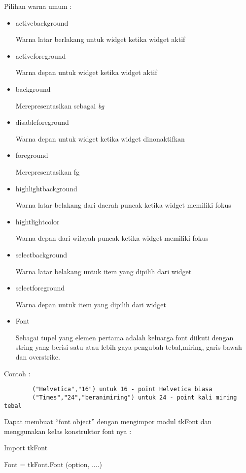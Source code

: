 \vspace{12pt}
Pilihan warna umum :
\noindent 
\begin{itemize}
	\item activebackground \par
	Warna latar berlakang untuk widget ketika widget aktif \par
	\noindent 
	\item activeforeground \par
	Warna depan untuk widget ketika widget aktif \par
	\noindent 
	\item background \par
	Merepresentasikan sebagai \textit{bg} \par
	\noindent 
	\item disableforeground \par
	Warna depan untuk widget ketika widget dinonaktifkan \par
	\noindent 
	\item foreground \par
	Merepresentasikan fg \par
	\noindent 
	\item highlightbackground \par
	Warna latar belakang dari daerah puncak ketika widget memiliki fokus \par
	\noindent 
	\item hightlightcolor \par
	Warna depan dari wilayah puncak ketika widget memiliki fokus \par
	\noindent 
	\item selectbackground \par
	Warna latar belakang untuk item yang dipilih dari widget \par
	\noindent 
	\item selectforeground \par
	Warna depan untuk item yang dipilih dari widget \par
	\noindent 
	\item Font \par
	\noindent 
	Sebagai tupel yang elemen pertama adalah keluarga font diikuti dengan string yang berisi satu atau lebih gaya pengubah tebal,miring, garis bawah dan overstrike. 
\end{itemize}
	\noindent 
Contoh : \par
	\begin{verbatim}
		("Helvetica","16") untuk 16 - point Helvetica biasa
		("Times","24","beranimiring") untuk 24 - point kali miring tebal
	\end{verbatim}
 		\par
\vspace{12pt}
Dapat membuat  ``font object'' dengan mengimpor modul tkFont dan menggunakan kelas konstruktor font nya : \par
Import tkFont \par
Font = tkFont.Font (option, ....) \par

